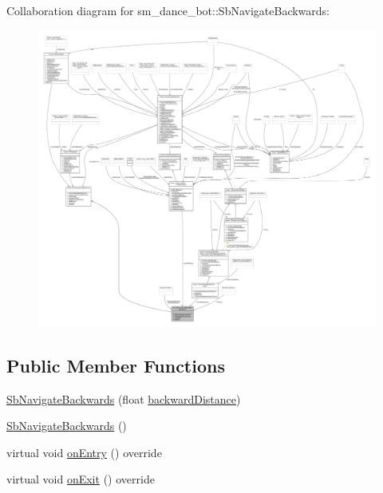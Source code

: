 Collaboration diagram for sm\+\_\+dance\+\_\+bot\+:\+:Sb\+Navigate\+Backwards\+:
\nopagebreak
\begin{figure}[H]
\begin{center}
\leavevmode
\includegraphics[width=350pt]{classsm__dance__bot_1_1SbNavigateBackwards__coll__graph}
\end{center}
\end{figure}
\subsection*{Public Member Functions}
\begin{DoxyCompactItemize}
\item 
\hyperlink{classsm__dance__bot_1_1SbNavigateBackwards_aa29315e48ef1517cbe6f4ddfc692d0f8}{Sb\+Navigate\+Backwards} (float \hyperlink{classsm__dance__bot_1_1SbNavigateBackwards_a521e30a8947d54e0c16b6ed87d01a89f}{backward\+Distance})
\item 
\hyperlink{classsm__dance__bot_1_1SbNavigateBackwards_a17483c9dbbc968080a609c6c9d09c82b}{Sb\+Navigate\+Backwards} ()
\item 
virtual void \hyperlink{classsm__dance__bot_1_1SbNavigateBackwards_a0ec7f67f6c036d9b4289275e5f40a224}{on\+Entry} () override
\item 
virtual void \hyperlink{classsm__dance__bot_1_1SbNavigateBackwards_a03c693e0b3cbf8157cc8783f2c94426c}{on\+Exit} () override
\end{DoxyCompactItemize}
